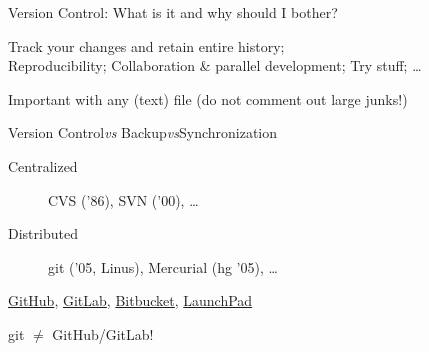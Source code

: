 \documentclass[aspectratio=169]{beamer}
\begin{document}
\begin{frame}%
  {Version Control: What is it and why should I bother?}

  \begin{description}\itemsep0.2cm
    \item[Why?] \alert{Track your changes and retain entire history};\\
      Reproducibility; Collaboration \& parallel development; Try stuff; \ldots
    \item[What?] Important with \alert{any} (text) file (do not comment out
      large junks!)
    \item[Watch out] \alert{Version Control}\quad \emph{vs}\quad
      \alert{Backup}\quad \emph{vs}\quad \alert{Synchronization}
    \item[Systems]
      \begin{description}
        \item[Centralized] CVS ('86), SVN ('00), \ldots
        \item[Distributed] git ('05, Linus), Mercurial (hg '05), \ldots
      \end{description}
    \item[Hostings]
      \href{https://github.com}{GitHub},
      \href{https://gitlab.com}{GitLab},
      \href{https://bitbucket.org}{Bitbucket},
      \href{https://launchpad.net}{LaunchPad}
  \end{description}

  {\centering \Large \alert{git $\ne$ GitHub/GitLab!}\\}\vfill

\end{frame}
\end{document}

